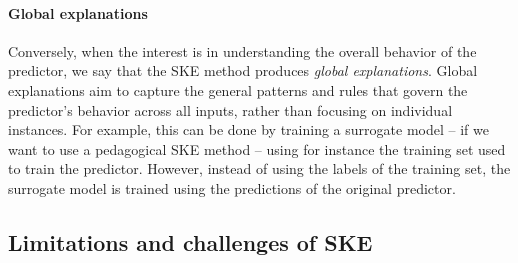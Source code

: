 \paragraph{Global explanations}\label{par:global-explanations}
%
Conversely, when the interest is in understanding the overall behavior of the predictor, we say that the \gls{SKE} method produces \emph{global explanations}.
%
Global explanations aim to capture the general patterns and rules that govern the predictor's behavior across all inputs, rather than focusing on individual instances.
%
For example, this can be done by training a surrogate model -- if we want to use a pedagogical \gls{SKE} method -- using for instance the training set used to train the predictor.
%
However, instead of using the labels of the training set, the surrogate model is trained using the predictions of the original predictor.


\subsection[Limitations and challenges of SKE]{Limitations and challenges of \Gls{SKE}}\label{subsec:limitations-and-challenges-of-ske}
